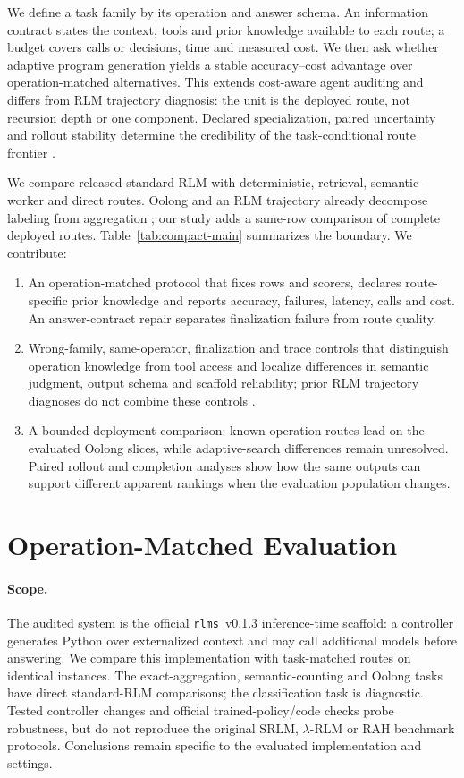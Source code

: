 \documentclass{article}
\begin{document}
We define a task family by its operation and answer schema. An information contract states the context, tools and prior knowledge available to each route; a budget covers calls or decisions, time and measured cost. We then ask whether adaptive program generation yields a stable accuracy--cost advantage over operation-matched alternatives. This extends cost-aware agent auditing \citep{kapoor2024agentsmatter,kapoor2026hal,bragg2026astabench} and differs from RLM trajectory diagnosis: the unit is the deployed route, not recursion depth or one component. Declared specialization, paired uncertainty and rollout stability determine the credibility of the task-conditional route frontier \citep{yu2020veridical}.

We compare released standard RLM with deterministic, retrieval, semantic-worker and direct routes. Oolong and an RLM trajectory already decompose labeling from aggregation \citep[App.~E.2]{zhang2025rlm}; our study adds a same-row comparison of complete deployed routes. Table~\ref{tab:compact-main} summarizes the boundary. We contribute:
\begin{enumerate}
    \item An operation-matched protocol that fixes rows and scorers, declares route-specific prior knowledge and reports accuracy, failures, latency, calls and cost. An answer-contract repair separates finalization failure from route quality.
    \item Wrong-family, same-operator, finalization and trace controls that distinguish operation knowledge from tool access and localize differences in semantic judgment, output schema and scaffold reliability; prior RLM trajectory diagnoses do not combine these controls \citep{zhang2025rlm,wang2026thinkdontoverthink}.
    \item A bounded deployment comparison: known-operation routes lead on the evaluated Oolong slices, while adaptive-search differences remain unresolved. Paired rollout and completion analyses show how the same outputs can support different apparent rankings when the evaluation population changes.
\end{enumerate}

\section{Operation-Matched Evaluation}

\paragraph{Scope.}
The audited system is the official \texttt{rlms}~v0.1.3 inference-time scaffold: a controller generates Python over externalized context and may call additional models before answering. We compare this implementation with task-matched routes on identical instances. The exact-aggregation, semantic-counting and Oolong tasks have direct standard-RLM comparisons; the classification task is diagnostic. Tested controller changes and official trained-policy/code checks probe robustness, but do not reproduce the original SRLM, $\lambda$-RLM or RAH benchmark protocols. Conclusions remain specific to the evaluated implementation and settings.
\end{document}
